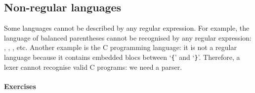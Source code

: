 \subsection*{Non-regular languages}

Some languages cannot be described by any regular expression. For
example, the language of balanced parentheses cannot be recognised by
any regular expression: \lparen\rparen, \lparen\lparen\rparen\rparen,
\lparen\rparen\lparen\rparen,
\lparen\lparen\lparen\rparen\rparen\lparen\rparen\rparen{}
etc. Another example is the C programming language: it is not a
regular language because it contains embedded blocs between `\verb+{+'
and `\verb+}+'. Therefore, a lexer cannot recognise valid C programs:
we need a parser.

\paragraph{Exercises}







